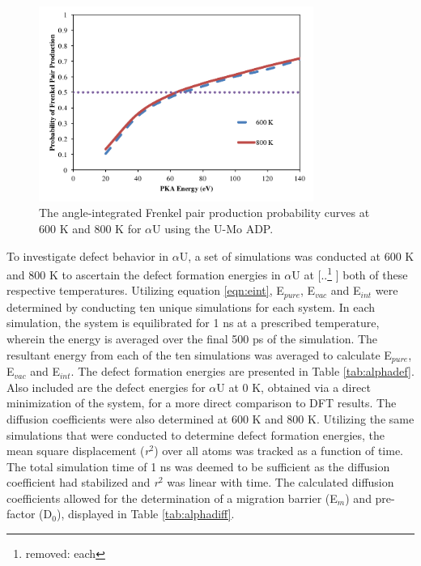 \documentclass[review]{elsarticle}
\providecommand{\DIFaddtex}[1]{{\protect\color{blue} \sf #1}} %
\providecommand{\DIFdeltex}[1]{{\protect\color{red} [..\footnote{removed: #1} ]}} %
\providecommand{\DIFaddbegin}{} %
\providecommand{\DIFaddend}{} %
\providecommand{\DIFdelbegin}{} %
\providecommand{\DIFdelend}{} %
\providecommand{\DIFadd}[1]{\texorpdfstring{\DIFaddtex{#1}}{#1}} %
\providecommand{\DIFdel}[1]{\texorpdfstring{\DIFdeltex{#1}}{}} %
\newcommand{\DIFscaledelfig}{0.5}
\newlength{\DIFdelgraphicswidth} %
\newlength{\DIFdelgraphicsheight} %
\newcommand{\DIFaddincludegraphics}[2][]{{\color{blue}\fbox{\DIFOincludegraphics[#1]{#2}}}} %
\newcommand{\DIFdelincludegraphics}[2][]{%
\sbox{\DIFdelgraphicsbox}{\DIFOincludegraphics[#1]{#2}}%
\settoboxwidth{\DIFdelgraphicswidth}{\DIFdelgraphicsbox} %
\settoboxtotalheight{\DIFdelgraphicsheight}{\DIFdelgraphicsbox} %
\scalebox{\DIFscaledelfig}{%
\parbox[b]{\DIFdelgraphicswidth}{\usebox{\DIFdelgraphicsbox}\\[-\baselineskip] \rule{\DIFdelgraphicswidth}{0em}}\llap{\resizebox{\DIFdelgraphicswidth}{\DIFdelgraphicsheight}{%
\setlength{\unitlength}{\DIFdelgraphicswidth}%
\begin{picture}(1,1)%
\thicklines\linethickness{2pt} %
{\color[rgb]{1,0,0}\put(0,0){\framebox(1,1){}}}%
{\color[rgb]{1,0,0}\put(0,0){\line( 1,1){1}}}%
{\color[rgb]{1,0,0}\put(0,1){\line(1,-1){1}}}%
\end{picture}%
}\hspace*{3pt}}} %
} %
\DeclareRobustCommand{\DIFaddbegin}{\DIFOaddbegin \let\includegraphics\DIFaddincludegraphics} %
\DeclareRobustCommand{\DIFaddend}{\DIFOaddend \let\includegraphics\DIFOincludegraphics} %
\DeclareRobustCommand{\DIFdelbegin}{\DIFOdelbegin \let\includegraphics\DIFdelincludegraphics} %
\DeclareRobustCommand{\DIFdelend}{\DIFOaddend \let\includegraphics\DIFOincludegraphics} %
\begin{document}
\begin{figure}[h]
 \centering
 \includegraphics[width=0.8\textwidth]{alpha.png} 	
 \caption{The angle-integrated Frenkel pair production probability curves at 600 K and 800 K for $\alpha$U using the U-Mo ADP.}
 \label{fig:alpha}
\end{figure}

\FloatBarrier

To investigate defect behavior in $\alpha$U, a set of simulations was conducted at 600 K and 800 K to ascertain the defect formation energies in $\alpha$U at \DIFdelbegin \DIFdel{each }\DIFdelend \DIFaddbegin \DIFadd{both }\DIFaddend of these respective temperatures. Utilizing equation \ref{eqn:eint}, E$_{pure}$, E$_{vac}$ and E$_{int}$ were determined by conducting ten unique simulations for each system. In each simulation, the system is equilibrated for 1 ns at a prescribed temperature, wherein the energy is averaged over the final 500 ps of the simulation. The resultant energy from each of the ten simulations was averaged to calculate E$_{pure}$, E$_{vac}$ and E$_{int}$. The defect formation energies are presented in Table \ref{tab:alphadef}. \DIFaddbegin \DIFadd{Also included are the defect energies for $\alpha$U at 0 K, obtained via a direct minimization of the system, for a more direct comparison to DFT results. }\DIFaddend The diffusion coefficients were also determined at 600 K and 800 K. Utilizing the same simulations that were conducted to determine defect formation energies, the mean square displacement \DIFaddbegin \DIFadd{(\textit{r}$^{2}$) }\DIFaddend over all atoms was tracked as a function of time. The total simulation time of 1 ns was deemed to be sufficient as the diffusion coefficient had stabilized and \textit{r}$^{2}$ was linear with time. The calculated diffusion coefficients allowed for the determination of a migration barrier (E$_{m}$) and pre-factor (D$_{0}$), displayed in Table \ref{tab:alphadiff}.
\end{document}
